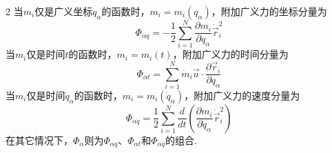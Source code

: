 \documentclass[12pt,twoside]{article}
\numberwithin{equation}{section}    %
\begin{document}
\begin{multicols}{2}
    当$m_i$仅是广义坐标$q_{\alpha}$的函数时，$m_i=m_i\left( q_{\alpha} \right) $，附加广义力的坐标分量为
    \begin{equation}
        \varPhi _{\alpha q}=-\frac{1}{2}\sum_{i=1}^N{\frac{\partial m_i}{\partial q_{\alpha}}\dot{\vec{r}}_{i}^{2}}
        \label{eq:12}
    \end{equation}
    当$m_i$仅是时间$t$的函数时，$m_i=m_i\left( t \right) $，附加广义力的时间分量为
    \begin{equation}
        \varPhi _{\alpha t}=\sum_{i=1}^N{\dot{m}_i\vec{u}\cdot \frac{\partial \vec{r}_i}{\partial q_{\alpha}}}
        \label{eq:13}
    \end{equation}
    当$m_i$仅是时间$\dot{q}_{\alpha}$的函数时，$m_i=m_i\left( \dot{q}_{\alpha} \right) $，附加广义力的速度分量为
    \begin{equation}
        \varPhi _{\alpha \dot{q}}=\frac{1}{2}\sum_{i=1}^N{\frac{d}{dt}\left( \frac{\partial m_i}{\partial \dot{q}_{\alpha}}\dot{\vec{r}}_{i}^{2} \right)}
        \label{eq:14}
    \end{equation}
    在其它情况下，$\varPhi _{\alpha}$则为$\varPhi _{\alpha q}$、$\varPhi _{\alpha t}$和$\varPhi _{\alpha \dot{q}}$的组合.


\end{multicols}
\end{document}

